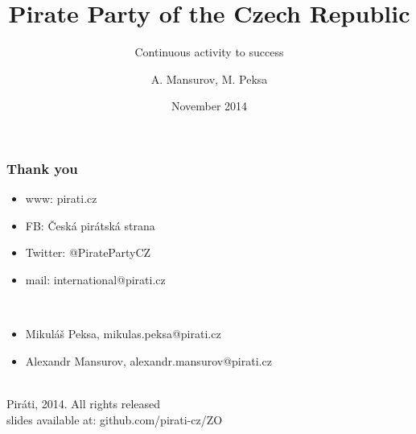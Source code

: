 \documentclass[sans]{beamer}
\begin{document}
	\title{Pirate Party of the Czech Republic}
	\subtitle{Continuous activity to success}
	\author{A. Mansurov, M. Peksa}
	\date{November 2014}
	
	\frame{\titlepage}
	
	
	\begin{frame}
		\frametitle{Thank you}
		\begin{itemize}
		\item www: pirati.cz
		\item FB: \v{C}esk\'a pir\'atsk\'a strana
		\item Twitter: @PiratePartyCZ
		\item mail: international@pirati.cz
		\end{itemize}
		~\\
		\begin{itemize}
		\item Mikul\'a\v{s} Peksa, mikulas.peksa@pirati.cz
		\item Alexandr Mansurov, alexandr.mansurov@pirati.cz
		\end{itemize}
		~\\
		\textcopyleft Pir\'ati, 2014. All rights released\\
		slides available at: github.com/pirati-cz/ZO
	\end{frame}
\end{document}
